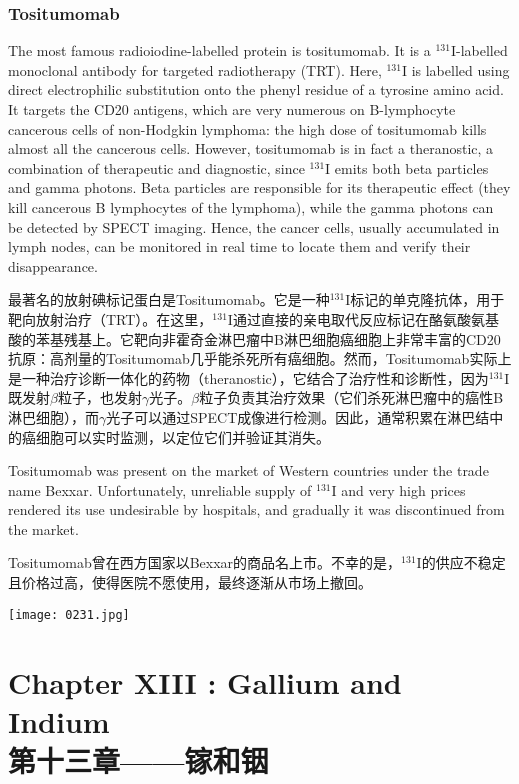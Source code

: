 \documentclass[dvipsnames, svgnames,a4paper,11pt]{article}
\begin{document}
\subsubsection{Tositumomab}  
The most famous radioiodine-labelled protein is tositumomab. It is a \(\mathrm{^{131}I}\)-labelled monoclonal antibody for targeted radiotherapy (TRT). Here, \(\mathrm{^{131}I}\) is labelled using direct electrophilic substitution onto the phenyl residue of a tyrosine amino acid. It targets the CD20 antigens, which are very numerous on B-lymphocyte cancerous cells of non-Hodgkin lymphoma: the high dose of tositumomab kills almost all the cancerous cells. However, tositumomab is in fact a theranostic, a combination of therapeutic and diagnostic, since \(\mathrm{^{131}I}\) emits both beta particles and gamma photons. Beta particles are responsible for its therapeutic effect (they kill cancerous B lymphocytes of the lymphoma), while the gamma photons can be detected by SPECT imaging. Hence, the cancer cells, usually accumulated in lymph nodes, can be monitored in real time to locate them and verify their disappearance.

最著名的放射碘标记蛋白是Tositumomab。它是一种\(\mathrm{^{131}I}\)标记的单克隆抗体，用于靶向放射治疗（TRT）。在这里，\(\mathrm{^{131}I}\)通过直接的亲电取代反应标记在酪氨酸氨基酸的苯基残基上。它靶向非霍奇金淋巴瘤中B淋巴细胞癌细胞上非常丰富的CD20抗原：高剂量的Tositumomab几乎能杀死所有癌细胞。然而，Tositumomab实际上是一种治疗诊断一体化的药物（theranostic），它结合了治疗性和诊断性，因为\(\mathrm{^{131}I}\)既发射\(\beta\)粒子，也发射$\gamma$光子。\(\beta\)粒子负责其治疗效果（它们杀死淋巴瘤中的癌性B淋巴细胞），而$\gamma$光子可以通过SPECT成像进行检测。因此，通常积累在淋巴结中的癌细胞可以实时监测，以定位它们并验证其消失。

Tositumomab was present on the market of Western countries under the trade name Bexxar. Unfortunately, unreliable supply of \(\mathrm{^{131}I}\) and very high prices rendered its use undesirable by hospitals, and gradually it was discontinued from the market.

Tositumomab曾在西方国家以Bexxar的商品名上市。不幸的是，\(\mathrm{^{131}I}\)的供应不稳定且价格过高，使得医院不愿使用，最终逐渐从市场上撤回。

\begin{figure*}[h]
	\centering
    \texttt{[image: 0231.jpg]}  
\end{figure*}

\newpage


\section{Chapter XIII :  Gallium and Indium \\第十三章——镓和铟}
\end{document}
